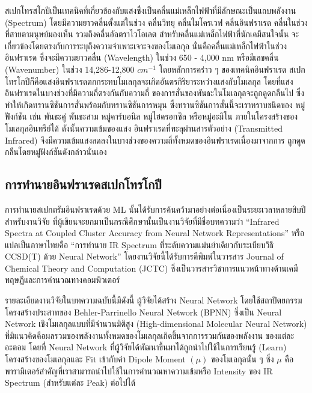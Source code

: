 สเปกโทรสโกปีเป็นเทคนิคที่เกี่ยวข้องกับแสงซึ่งเป็นคลื่นแม่เหล็กไฟฟ้าที่มีลักษณะเป็นแถบพลังงาน (Spectrum) โดยมีความยาวคลื่นตั้งแต่ในช่วง 
คลื่นวิทยุ คลื่นไมโครเวฟ คลื่นอินฟราเรด คลื่นในช่วงที่สายตามนุษย์มองเห็น รวมถึงคลื่นอัลตราไวโอเลต สำหรับคลื่นแม่เหล็กไฟฟ้าที่นักเคมีสนใจนั้น%
จะเกี่ยวข้องโดยตรงกับการระบุถึงความจำเพาะเจาะจงของโมเลกุล นั่นคือคลื่นแม่เหล็กไฟฟ้าในช่วงอินฟราเรด ซึ่งจะมีความยาวคลื่น (Wavelength) 
ในช่วง 650 - 4,000 nm หรือมีเลขคลื่น (Wavenumber) ในช่วง 14,286-12,800 $cm^{-1}$ โดยหลักการคร่าว ๆ ของเทคนิคอินฟราเรด%
สเปกโทรโกปีก็คือแสงอินฟราเรดตกกระทบโมเลกุลจะเกิดอันตรกิริยาระหว่างแสงกับโมเลกุล โดยที่แสงอินฟราเรดในบางช่วงที่มีความถี่ตรงกันกับความถี่%
ของการสั่นของพันธะในโมเลกุลจะถูกดูดกลืนไป ซึ่งทำให้เกิดทรานซิชันการสั่นพร้อมกับทรานซิชันการหมุน ซึ่งทรานซิชันการสั่นนี้จะเราทราบชนิดของ%
หมู่ฟังก์ชัน เช่น พันธะคู่ พันธะสาม หมู่คาร์บอนิล หมู่ไฮดรอกซิล หรือหมู่อะมิโน ภายในโครงสร้างของโมเลกุลอินทรีย์ได้ ดังนั้นความเข้มของแสง%
อินฟราเรดที่ทะลุผ่านสารตัวอย่าง (Transmitted Infrared) จึงมีความเข้มแสงลดลงในบางช่วงของความถี่ทั้งหมดของอินฟราเรดเนื่องมาจากการ%
ถูกดูดกลืนโดยหมู่ฟังก์ชันดังกล่าวนั่นเอง

\subsection{การทำนายอินฟราเรดสเปกโทรโกปี}
\label{ssec:pred_spec_ir}

การทำนายสเปกตรัมอินฟราเรดด้วย ML นั้นได้รับการค้นคว้ามาอย่างต่อเนื่องเป็นระยะเวลาหลายสิบปี\autocite{gastegger2017} สำหรับงานวิจัย%
ที่ผู้เขียนจะยกมาเป็นกรณีศึกษานั้นเป็นงานวิจัยที่มีชื่อบทความว่า \enquote{Infrared Spectra at Coupled Cluster Accuracy from Neural 
Network Representations} หรือแปลเป็นภาษาไทยคือ \enquote{การทำนาย IR Spectrum ที่ระดับความแม่นยำเดียวกับระเบียบวิธี CCSD(T) 
ด้วย Neural Network}\autocite{beckmann2022} โดยงานวิจัยนี้ได้รับการตีพิมพ์ในวารสาร Journal of Chemical Theory and Computation 
(JCTC) ซึ่งเป็นวารสารวิชาการแนวหน้าทางด้านเคมีทฤษฎีและการคำนวณทางคอมพิวเตอร์ 

รายละเอียดงานวิจัยในบทความฉบับนี้มีดังนี้ ผู้วิจัยได้สร้าง Neural Network โดยใช้สถาปัตยกรรมโครงสร้างประสาทของ Behler-Parrinello 
Neural Network (BPNN)\autocite{behler2007,behler2011b,behler2015} ซึ่งเป็น Neural Network เชิงโมเลกุลแบบที่มีจำนวนมิติสูง 
(High-dimensional Molecular Neural Network) ที่มีแนวคิดคือผลรวมของพลังงานทั้งหมดของโมเลกุลเกิดขึ้นจากการรวมกันของพลังงาน%
ของแต่ละอะตอม โดยที่ Neural Network ที่ผู้วิจัยได้พัฒนาขึ้นมาได้ถูกนำไปใช้ในการเรียนรู้ (Learn) โครงสร้างของโมเลกุลและ Fit เข้ากับค่า 
Dipole Moment $(\mu)$ ของโมเลกุลนั้น ๆ ซึ่ง $\mu$ คือพารามิเตอร์สำคัญที่เราสามารถนำไปใช้ในการคำนวณหาความเข้มหรือ Intensity 
ของ IR Spectrum (สำหรับแต่ละ Peak) ต่อไปได้

